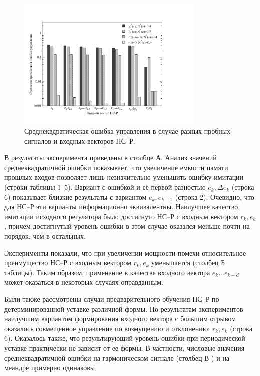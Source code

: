 \begin{figure}[h]
\centering
\includegraphics[width=0.8\textwidth,%
  height=0.35\textheight]{pretr_input_vec_rus}
\caption{Среднеквдратическая ошибка управления в случае разных
  пробных сигналов и входных векторов НС--Р.}
\label{fig:pretr_input_vec_rus}
\end{figure}

В  результаты эксперимента приведены
в столбце {\sf А}.  Анализ значений среднеквадратичной ошибки
показывает, что увеличение емкости памяти прошлых входов позволяет
лишь незначительно уменьшить ошибку имитации (строки таблицы 1--5).
Вариант с ошибкой и её первой разностью $e_k,\Delta e_k$ (строка 6)
показывает близкие результаты с вариантом $e_k,e_{k-1}$ (строка 2).
Очевидно, что для НС--Р эти варианты информационно эквивалентны.
Наилучшее качество имитации исходного регулятора было достигнуто НС--Р
с входным вектором $r_k,e_k$, причем достигнутый уровень ошибки в этом
случае оказался меньше почти на порядок, чем в остальных.

Эксперименты показали, что при увеличении мощности помехи
относительное преимущество НС--Р с входным вектором $r_k,e_k$
уменьшается (столбец {\sf Б} таблицы).  Таким образом, применение в
качестве входного вектора $e_k\ldots e_{k-d}$ может оказаться в
некоторых случаях оправданным.

Были также рассмотрены случаи предварительного обучения НС--Р по
детерминированной уставке различной формы.  По результатам
экспериментов наилучшим вариантом формирования входного вектора с
большим отрывом оказалось совмещенное управление по возмущению и
отклонению: $r_k,e_k$ (строка 6).  Оказалось также, что результирующий
уровень ошибки при периодической уставке практически не зависит от ее
формы.  В частности, числовые значения среднеквадратичной ошибки на
гармоническом сигнале (столбец {\sf В}
) и на меандре примерно одинаковы.

